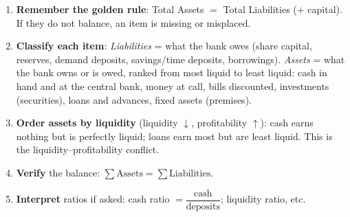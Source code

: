 \documentclass[11pt]{article}
\newcommand{\cle}[1]{{\popxbold\color{popdark}#1}}
\begin{document}
\begin{methode}
\begin{enumerate}
\item \textbf{Remember the golden rule}: Total Assets $=$ Total Liabilities ($+$ capital). If they do not balance, an item is missing or misplaced.
\item \textbf{Classify each item}: \emph{Liabilities} = what the bank owes (share capital, reserves, demand deposits, savings/time deposits, borrowings). \emph{Assets} = what the bank owns or is owed, ranked from most liquid to least liquid: cash in hand and at the central bank, money at call, bills discounted, investments (securities), loans and advances, fixed assets (premises).
\item \textbf{Order assets by liquidity} (liquidity $\downarrow$, profitability $\uparrow$): cash earns nothing but is perfectly liquid; loans earn most but are least liquid. This is the \cle{liquidity--profitability conflict}.
\item \textbf{Verify} the balance: $\sum \text{Assets} = \sum \text{Liabilities}$.
\item \textbf{Interpret} ratios if asked: cash ratio $= \dfrac{\text{cash}}{\text{deposits}}$; liquidity ratio, etc.
\end{enumerate}
\end{methode}
\end{document}
